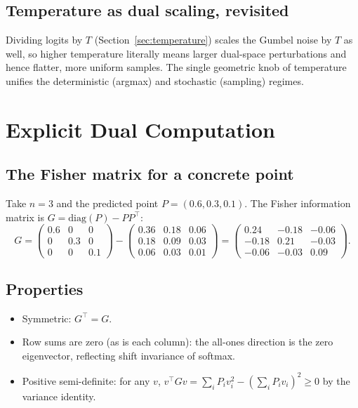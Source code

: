 \documentclass[11pt]{article}
\begin{document}
\subsection{Temperature as dual scaling, revisited}
\label{sec:samp-temp}

Dividing logits by $T$ (Section~\ref{sec:temperature}) scales the Gumbel noise
by $T$ as well, so higher temperature literally means larger dual-space
perturbations and hence flatter, more uniform samples. The single geometric
knob of temperature unifies the deterministic (argmax) and stochastic
(sampling) regimes.

\section{Explicit Dual Computation}
\label{sec:explicit}

\subsection{The Fisher matrix for a concrete point}
\label{sec:exp-matrix}

Take $n=3$ and the predicted point $P=(0.6,0.3,0.1)$. The Fisher information
matrix is $G = \mathrm{diag}(P) - PP^{\!\top}$:
\[
G =
\begin{pmatrix}
0.6 & 0 & 0 \\
0 & 0.3 & 0 \\
0 & 0 & 0.1
\end{pmatrix}
-
\begin{pmatrix}
0.36 & 0.18 & 0.06 \\
0.18 & 0.09 & 0.03 \\
0.06 & 0.03 & 0.01
\end{pmatrix}
=
\begin{pmatrix}
0.24 & -0.18 & -0.06 \\
-0.18 & 0.21 & -0.03 \\
-0.06 & -0.03 & 0.09
\end{pmatrix}.
\]

\subsection{Properties}
\label{sec:exp-prop}

\begin{itemize}
\item Symmetric: $G^\top=G$.
\item Row sums are zero (as is each column): the all-ones direction is the zero
eigenvector, reflecting shift invariance of softmax.
\item Positive semi-definite: for any $v$, $v^\top G v = \sum_i P_i v_i^2 -
(\sum_i P_i v_i)^2 \ge 0$ by the variance identity.
\end{itemize}
\end{document}
